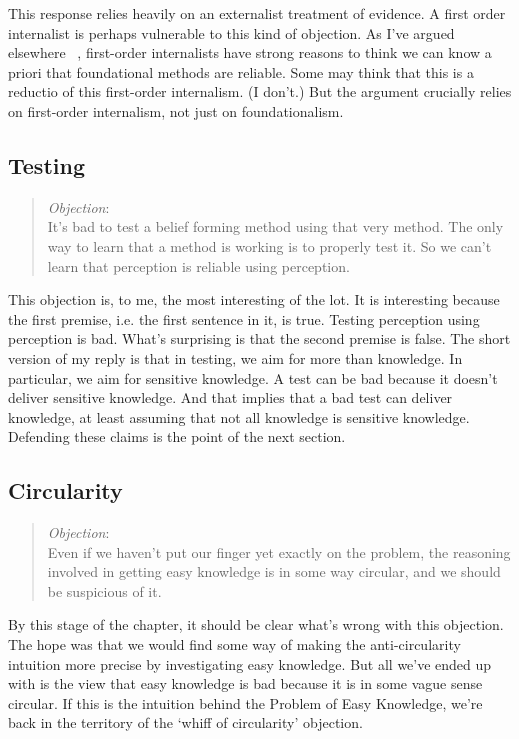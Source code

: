 This response relies heavily on an externalist treatment of evidence. A first order internalist is perhaps vulnerable to this kind of objection. As I've argued elsewhere ~\citep{Weatherson2005}, first-order internalists have strong reasons to think we can know a priori that foundational methods are reliable. Some may think that this is a reductio of this first-order internalism. (I don't.) But the argument crucially relies on first-order internalism, not just on foundationalism.

\subsection{Testing}
\label{testing}

\begin{quote}
\emph{Objection}:\\
It's bad to test a belief forming method using that very method. The only way to learn that a method is working is to properly test it. So we can't learn that perception is reliable using perception.
\end{quote}
This objection is, to me, the most interesting of the lot. It is interesting because the first premise, i.e. the first sentence in it, is true. Testing perception using perception is bad. What's surprising is that the second premise is false. The short version of my reply is that in testing, we aim for more than knowledge. In particular, we aim for sensitive knowledge. A test can be bad because it doesn't deliver sensitive knowledge. And that implies that a bad test can deliver knowledge, at least assuming that not all knowledge is sensitive knowledge. Defending these claims is the point of the next section.

\subsection{Circularity}
\label{circularity}

\begin{quote}
\emph{Objection}:\\
Even if we haven't put our finger yet exactly on the problem, the reasoning involved in getting easy knowledge is in some way circular, and we should be suspicious of it.
\end{quote}
By this stage of the chapter, it should be clear what's wrong with this objection. The hope was that we would find some way of making the anti-circularity intuition more precise by investigating easy knowledge. But all we've ended up with is the view that easy knowledge is bad because it is in some vague sense circular. If this is the intuition behind the Problem of Easy Knowledge, we're back in the territory of the `whiff of circularity' objection.

